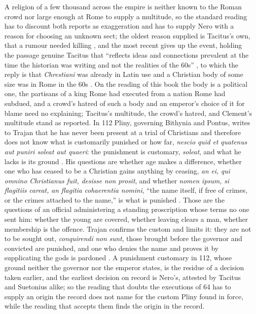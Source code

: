 A religion of a few thousand across the empire is neither known to the Roman crowd nor large enough at Rome to supply a multitude, so the standard reading has to discount both reports as exaggeration and has to supply Nero with a reason for choosing an unknown sect; the oldest reason supplied is Tacitus's own, that a rumour needed killing \cite[15.44]{tacitus:annals}, and the most recent gives up the event, holding the passage genuine Tacitus that ``reflects ideas and connections prevalent at the time the historian was writing and not the realities of the 60s'' \cite{shaw:myth-neronian-persecution}, to which the reply is that \emph{Chrestiani} was already in Latin use and a Christian body of some size was in Rome in the 60s \cite{jones:historicity-neronian-persecution}.
On the reading of this book the body is a political one, the partisans of a king Rome had executed from a nation Rome had subdued, and a crowd's hatred of such a body and an emperor's choice of it for blame need no explaining; Tacitus's multitude, the crowd's hatred, and Clement's multitude stand as reported.
In 112 Pliny, governing Bithynia and Pontus, writes to Trajan that he has never been present at a trial of Christians and therefore does not know what is customarily punished or how far, \emph{nescio quid et quatenus aut puniri soleat aut quaeri}: the punishment is customary, \emph{soleat}, and what he lacks is its ground \cite[10.96]{pliny:letters}.
His questions are whether age makes a difference, whether one who has ceased to be a Christian gains anything by ceasing, \emph{an ei, qui omnino Christianus fuit, desisse non prosit}, and whether \emph{nomen ipsum, si flagitiis careat, an flagitia cohaerentia nomini}, ``the name itself, if free of crimes, or the crimes attached to the name,'' is what is punished \cite[10.96]{pliny:letters}.
Those are the questions of an official administering a standing proscription whose terms no one sent him: whether the young are covered, whether leaving clears a man, whether membership is the offence.
Trajan confirms the custom and limits it: they are not to be sought out, \emph{conquirendi non sunt}, those brought before the governor and convicted are punished, and one who denies the name and proves it by supplicating the gods is pardoned \cite[10.97]{pliny:letters}.
A punishment customary in 112, whose ground neither the governor nor the emperor states, is the residue of a decision taken earlier, and the earliest decision on record is Nero's, attested by Tacitus and Suetonius alike; so the reading that doubts the executions of 64 has to supply an origin the record does not name for the custom Pliny found in force, while the reading that accepts them finds the origin in the record.
